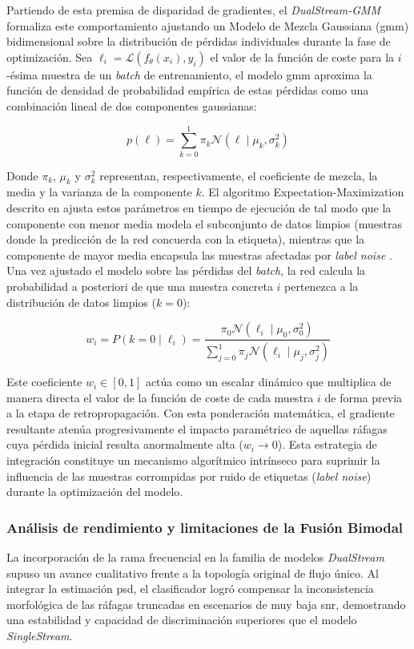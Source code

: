 Partiendo de esta premisa de disparidad de gradientes, el \textit{DualStream-GMM} formaliza este comportamiento ajustando un Modelo de Mezcla Gaussiana (\gls{gmm}) bidimensional sobre la distribución de pérdidas individuales durante la fase de optimización. Sea $\ell_i = \mathcal{L}(f_\theta(x_i), y_i)$ el valor de la función de coste para la $i$-ésima muestra de un \textit{batch} de entrenamiento, el modelo \gls{gmm} aproxima la función de densidad de probabilidad empírica de estas pérdidas como una combinación lineal de dos componentes gaussianas:

\begin{equation}
    p(\ell) = \sum_{k=0}^{1} \pi_k \mathcal{N}(\ell \mid \mu_k, \sigma_k^2)
\end{equation}

Donde $\pi_k$, $\mu_k$ y $\sigma_k^2$ representan, respectivamente, el coeficiente de mezcla, la media y la varianza de la componente $k$. El algoritmo Expectation-Maximization descrito en \cite{li_dividemix_2020} ajusta estos parámetros en tiempo de ejecución de tal modo que la componente con menor media modela el subconjunto de datos limpios (muestras donde la predicción de la red concuerda con la etiqueta), mientras que la componente de mayor media encapsula las muestras afectadas por \textit{label noise} \cite{najar_comparison_2017}. 
Una vez ajustado el modelo sobre las pérdidas del \textit{batch}, la red calcula la probabilidad a posteriori de que una muestra concreta $i$ pertenezca a la distribución de datos limpios ($k=0$):

\begin{equation}
    w_i = P(k=0 \mid \ell_i) = \frac{\pi_0 \mathcal{N}(\ell_i \mid \mu_0, \sigma_0^2)}{\sum_{j=0}^{1} \pi_j \mathcal{N}(\ell_i \mid \mu_j, \sigma_j^2)}
\end{equation}

Este coeficiente $w_i \in [0, 1]$ actúa como un escalar dinámico que multiplica de manera directa el valor de la función de coste de cada muestra $i$ de forma previa a la etapa de retropropagación. Con esta ponderación matemática, el gradiente resultante atenúa progresivamente el impacto paramétrico de aquellas ráfagas cuya pérdida inicial resulta anormalmente alta ($w_i \to 0$). Esta estrategia de integración constituye un mecanismo algorítmico intrínseco para suprimir la influencia de las muestras corrompidas por ruido de etiquetas (\textit{label noise}) durante la optimización del modelo.

\subsubsection{Análisis de rendimiento y limitaciones de la Fusión Bimodal}
La incorporación de la rama frecuencial en la familia de modelos \textit{DualStream} supuso un avance cualitativo frente a la topología original de flujo único. Al integrar la estimación \gls{psd}, el clasificador logró compensar la inconsistencia morfológica de las ráfagas truncadas en escenarios de muy baja \gls{snr}, demostrando una estabilidad y capacidad de discriminación superiores que el modelo \textit{SingleStream}.

